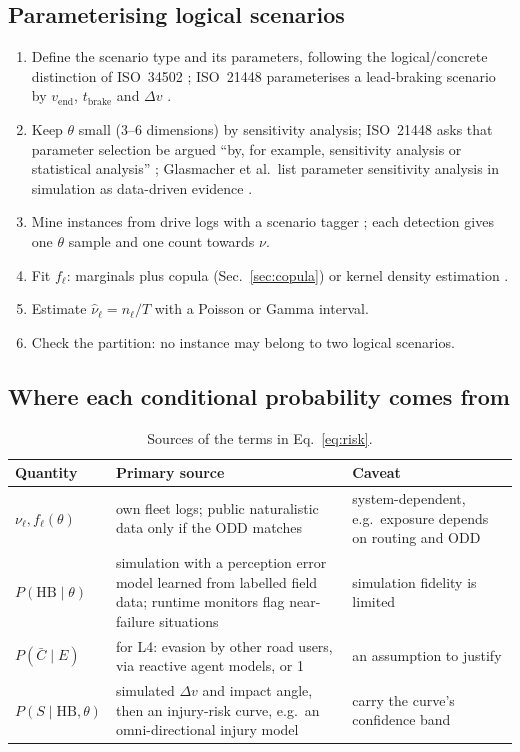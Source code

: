 \documentclass[11pt,a4paper]{article}
\begin{document}
\subsection{Parameterising logical scenarios}
\begin{enumerate}
\item Define the scenario type and its parameters, following the logical/concrete distinction of ISO~34502 \cite[location not verified]{iso34502}; ISO~21448 parameterises a lead-braking scenario by $v_{\text{end}}$, $t_{\text{brake}}$ and $\Delta v$ \cite[C.5, Figure~C.10, p.~147]{iso21448}.
\item Keep $\theta$ small (3--6 dimensions) by sensitivity analysis; ISO~21448 asks that parameter selection be argued ``by, for example, sensitivity analysis or statistical analysis'' \cite[11.3, Table~11 Note, p.~51]{iso21448}; Glasmacher et al.\ list parameter sensitivity analysis in simulation as data-driven evidence \cite[Sec.~III-D, Table~I]{glasmacher2024}.
\item Mine instances from drive logs with a scenario tagger \cite[Secs.~III-A--III-C]{guo2023}; each detection gives one $\theta$ sample and one count towards $\nu$.
\item Fit $f_\ell$: marginals plus copula (Sec.~\ref{sec:copula}) or kernel density estimation \cite[Ch.~3 and Ch.~6]{degelder2022}.
\item Estimate $\hat\nu_\ell=n_\ell/T$ with a Poisson or Gamma interval.
\item Check the partition: no instance may belong to two logical scenarios.
\end{enumerate}

\subsection{Where each conditional probability comes from}
\begin{table}[H]\centering\small
\caption{Sources of the terms in Eq.~\eqref{eq:risk}.}
\begin{tabular}{L{2.4cm}L{6.6cm}L{5.4cm}}
\toprule
Quantity & Primary source & Caveat\\\midrule
$\nu_\ell, f_\ell(\theta)$ & own fleet logs; public naturalistic data only if the ODD matches & system-dependent, e.g.\ exposure depends on routing and ODD \cite[Sec.~IV-B(b)--(c)]{putze2023}\\
$P(\mathrm{HB}\mid\theta)$ & simulation with a perception error model learned from labelled field data; runtime monitors flag near-failure situations \cite[Sec.~6.2, pp.~16--17]{schaller2026} & simulation fidelity is limited \cite[Sec.~V, RA ``Simulation-based Testing'']{betschinske2025}\\
$P(\bar C\mid E)$ & for L4: evasion by other road users, via reactive agent models, or 1 & an assumption to justify\\
$P(S\mid\mathrm{HB},\theta)$ & simulated $\Delta v$ and impact angle, then an injury-risk curve, e.g.\ an omni-directional injury model \cite[web page]{waymoinjury} & carry the curve's confidence band\\
\bottomrule
\end{tabular}
\end{table}
\end{document}
